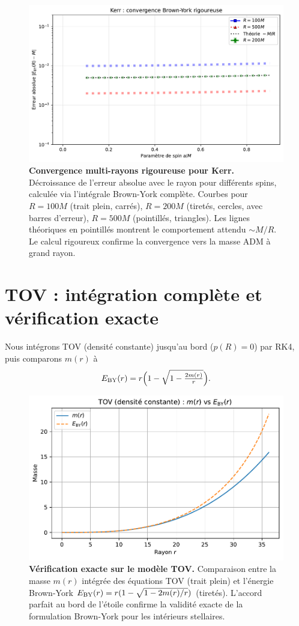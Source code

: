 \documentclass[11pt]{article}
\begin{document}
\begin{figure}[!htb]
\centering
\includegraphics[width=.75\linewidth]{fig_kerr_multiradius.pdf}
\caption{\textbf{Convergence multi-rayons rigoureuse pour Kerr.} Décroissance de l'erreur absolue avec le rayon pour différents spins, calculée via l'intégrale Brown-York complète. Courbes pour $R = 100M$ (trait plein, carrés), $R = 200M$ (tiretés, cercles, avec barres d'erreur), $R = 500M$ (pointillés, triangles). Les lignes théoriques en pointillés montrent le comportement attendu $\sim M/R$. Le calcul rigoureux confirme la convergence vers la masse ADM à grand rayon.}
\end{figure}
\clearpage

\section{TOV : int\'egration compl\`ete et v\'erification exacte}
Nous int\'egrons TOV (densit\'e constante) jusqu'au bord (\(p(R)=0\)) par RK4, puis comparons $m(r)$ \`a 
\begin{equation}
E_{\rm BY}(r)=r\Big(1-\sqrt{1-\tfrac{2m(r)}{r}}\Big).
\end{equation}
\begin{figure}[!htb]
\centering
\includegraphics[width=.75\linewidth]{fig_tov_full.pdf}
\caption{\textbf{Vérification exacte sur le modèle TOV.} Comparaison entre la masse $m(r)$ intégrée des équations TOV (trait plein) et l'énergie Brown-York $E_{\rm BY}(r) = r(1-\sqrt{1-2m(r)/r})$ (tiretés). L'accord parfait au bord de l'étoile confirme la validité exacte de la formulation Brown-York pour les intérieurs stellaires.}
\end{figure}
\clearpage
\end{document}
